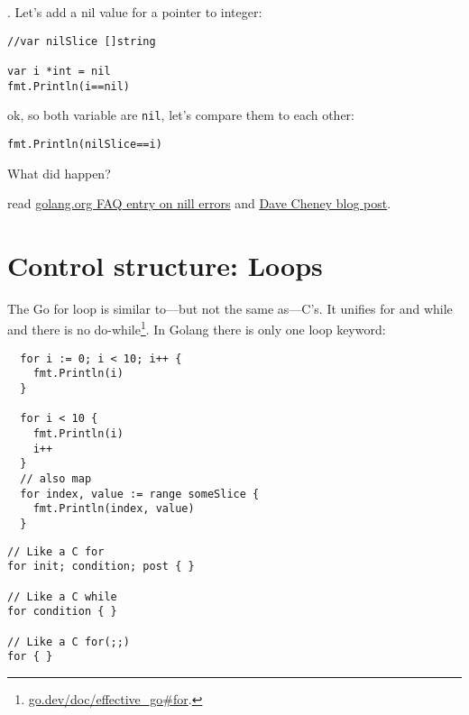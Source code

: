 \documentclass[11pt, letterpaper]{article}
\begin{document}
. Let's add a nil value for a pointer to integer:

\begin{verbatim}
//var nilSlice []string

var i *int = nil
fmt.Println(i==nil)
\end{verbatim}

ok, so both variable are \texttt{nil}, let's compare them to each other:

\begin{verbatim}
fmt.Println(nilSlice==i)
\end{verbatim}

\bigskip
What did happen?

\bigskip
[Homework] read \href{https://golang.org/doc/faq#nil_error}{golang.org {\small FAQ} entry on nill errors} and \href{https://dave.cheney.net/2017/08/09/typed-nils-in-go-2}{Dave Cheney blog post}.







\section{Control structure: Loops}

The Go for loop is similar to—but not the same as—C's. It unifies for and while and there is no do-while\footnote{\href{https://go.dev/doc/effective\_go\#for}{go.dev/doc/effective\_go\#for}.}. In Golang there is only one loop keyword:

\begin{verbatim}
  for i := 0; i < 10; i++ {
    fmt.Println(i)
  }

  for i < 10 {
    fmt.Println(i)
    i++
  }
  // also map
  for index, value := range someSlice {
    fmt.Println(index, value)
  }
\end{verbatim}

\begin{verbatim}
// Like a C for
for init; condition; post { }

// Like a C while
for condition { }

// Like a C for(;;)
for { }
\end{verbatim}
\end{document}
